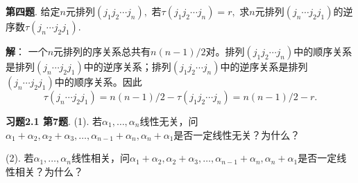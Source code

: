 \newpageorvspace

{\bf 第四题}. 给定$n$元排列$(j_1j_2\cdots j_n),$ 若$\tau(j_1j_2\cdots j_n) = r,$ 求$n$元排列$(j_n\cdots j_2j_1)$的逆序数$\tau(j_n\cdots j_2j_1)$.

\newpageorvspace

{\bf 解}： 一个$n$元排列的序关系总共有$n(n-1)/2$对。排列$(j_1j_2\cdots j_n)$中的顺序关系是排列$(j_n\cdots j_2j_1)$中的逆序关系；排列$(j_1j_2\cdots j_n)$中的逆序关系是排列$(j_n\cdots j_2j_1)$中的顺序关系。因此
$$\tau(j_n\cdots j_2j_1) = n(n-1)/2 - \tau(j_1j_2\cdots j_n) = n(n-1)/2 - r.$$

\newpageorvspace

{\bf 习题2.1 第7题}. (1). 若$\alpha_1, \ldots, \alpha_n$线性无关，问$\alpha_1 + \alpha_2, \alpha_2 + \alpha_3, \ldots, \alpha_{n-1} + \alpha_n, \alpha_n + \alpha_1$是否一定线性无关？为什么？

(2). 若$\alpha_1, \ldots, \alpha_n$线性相关，问$\alpha_1 + \alpha_2, \alpha_2 + \alpha_3, \ldots, \alpha_{n-1} + \alpha_n, \alpha_n + \alpha_1$是否一定线性相关？为什么？

\newpageorvspace

